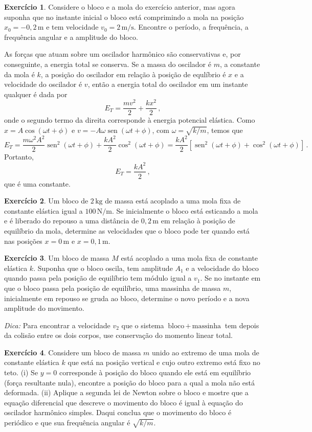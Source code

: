 \documentclass[12pt,a4paper]{article}
\theoremstyle{definition}
\newtheorem{ex}{Exercício}[section]
\DeclareMathOperator{\sen}{sen}
\begin{document}
\begin{ex}
  Considere o bloco e a mola do exercício anterior, mas agora suponha
  que no instante inicial o bloco está comprimindo a mola na posição
  $x_0=-0{,}2\,\mathrm{m}$ e tem velocidade
  $v_0=2\,\mathrm{m/s}$. Encontre o período, a frequência, a
  frequência angular e a amplitude do bloco.
\end{ex}

As forças que atuam sobre um oscilador harmônico são conservativas e,
por conseguinte, a energia total se conserva. Se a massa do oscilador
é $m$, a constante da mola é $k$, a posição do oscilador em relação à
posição de equlíbrio é $x$ e a velocidade do oscilador é $v$, então a
energia total do oscilador em um instante qualquer é dada por
$$E_T=\frac{mv^2}{2}+\frac{kx^2}{2}\,,$$
onde o segundo termo da direita corresponde à energia potencial
elástica. Como $x=A\cos(\omega t+\phi)$ e
$v=-A\omega\sen(\omega t+\phi)$, com $\omega=\sqrt{k/m}$, temos que
$$E_T=\frac{m\omega^2A^2}{2}\sen^2(\omega t+\phi)+\frac{kA^2}{2}\cos^2(\omega t+\phi)=\frac{kA^2}{2}[\sen^2(\omega t+\phi)+\cos^2(\omega t+\phi)]\,.$$
Portanto,
$$E_T=\frac{kA^2}{2}\,,$$
que é uma constante.

\begin{ex}
  Um bloco de $2\,\mathrm{kg}$ de massa está acoplado a uma mola fixa
  de constante elástica igual a $100\,\mathrm{N/m}$. Se inicialmente o
  bloco está esticando a mola e é liberado do repouso a uma distância
  de $0{,}2\,\mathrm{m}$ em relação à posição de equilíbrio da mola,
  determine as velocidades que o bloco pode ter quando está nas
  posições $x=0\,\mathrm{m}$ e $x=0{,}1\,\mathrm{m}$.
\end{ex}

\begin{ex}
  Um bloco de massa $M$ está acoplado a uma mola fixa de constante
  elástica $k$. Suponha que o bloco oscila, tem amplitude $A_1$ e a
  velocidade do bloco quando passa pela posição de equilíbrio tem
  módulo igual a $v_1$. Se no instante em que o bloco passa pela
  posição de equilíbrio, uma massinha de massa $m$, inicialmente em
  repouso se gruda ao bloco, determine o novo período e a nova
  amplitude do movimento.

  \noindent\textit{Dica:} Para encontrar a velocidade $v_2$ que o
  sistema $\text{bloco}\,+\,\text{massinha}$ tem depois da colisão
  entre os dois corpos, use conservação do momento linear total.
\end{ex}

\begin{ex}
  Considere um bloco de massa $m$ unido ao extremo de uma mola de
  constante elástica $k$ que está na posição vertical e cujo outro
  extremo está fixo no teto. (i) Se $y=0$ corresponde à posição do
  bloco quando ele está em equilíbrio (força resultante nula),
  encontre a posição do bloco para a qual a mola não está
  deformada. (ii) Aplique a segunda lei de Newton sobre o bloco e
  mostre que a equação diferencial que descreve o movimento do bloco é
  igual à equação do oscilador harmônico simples. Daqui conclua que o
  movimento do bloco é periódico e que sua frequência angular é
  $\sqrt{k/m}$.
\end{ex}
\end{document}
